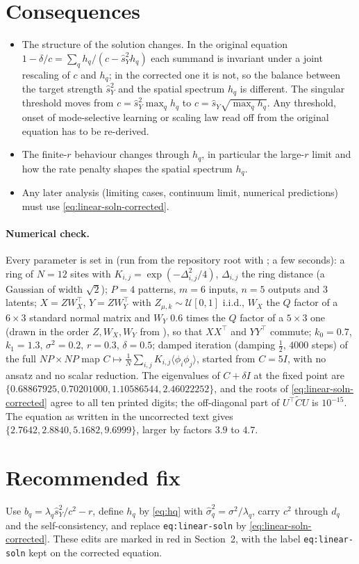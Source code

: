 \documentclass[11pt,a4paper]{article}
\begin{document}
\section{Consequences}
\begin{itemize}
  \item The structure of the solution changes. In the original equation $1-\delta/c = \sum_q h_q/(c-\hat s_Y^2h_q)$ each summand is invariant under a joint rescaling of $c$ and $h_q$; in the corrected one it is not, so the balance between the target strength $\hat s_Y^2$ and the spatial spectrum $h_q$ is different. The singular threshold moves from $c = \hat s_Y^2\max_q h_q$ to $c = \hat s_Y\sqrt{\max_q h_q}$. Any threshold, onset of mode-selective learning or scaling law read off from the original equation has to be re-derived.
  \item The finite-$r$ behaviour changes through $h_q$, in particular the large-$r$ limit and how the rate penalty shapes the spatial spectrum $h_q$.
  \item Any later analysis (limiting cases, continuum limit, numerical predictions) must use \eqref{eq:linear-soln-corrected}.
\end{itemize}

\paragraph{Numerical check.}
Every parameter is set in  (run from the repository root with ; a few seconds):
a ring of $N=12$ sites with $K_{i,j} = \exp(-\Delta_{i,j}^2/4)$, $\Delta_{i,j}$ the ring distance (a Gaussian of width $\sqrt2$);
$P=4$ patterns, $m=6$ inputs, $n=5$ outputs and $3$ latents;
$X = ZW_X^\top$, $Y = ZW_Y^\top$ with $Z_{\mu,k}\sim\mathcal U[0,1]$ i.i.d., $W_X$ the $Q$ factor of a $6\times3$ standard normal matrix and $W_Y$ $0.6$ times the $Q$ factor of a $5\times3$ one (drawn in the order $Z, W_X, W_Y$ from ), so that $XX^\top$ and $YY^\top$ commute;
$k_0 = 0.7$, $k_1 = 1.3$, $\sigma^2 = 0.2$, $r = 0.3$, $\delta = 0.5$;
damped iteration (damping $\tfrac12$, $4000$ steps) of the full $NP\times NP$ map $C \mapsto \frac1N\sum_{i,j}K_{i,j}\langle\phi_i\phi_j\rangle$, started from $C = 5I$, with no ansatz and no scalar reduction.
The eigenvalues of $C+\delta I$ at the fixed point are $\{0.68867925, 0.70201000, 1.10586544, 2.46022252\}$, and the roots of \eqref{eq:linear-soln-corrected} agree to all ten printed digits; the off-diagonal part of $U^\top\tilde C U$ is $10^{-15}$.
The equation as written in the uncorrected text gives $\{2.7642, 2.8840, 5.1682, 9.6999\}$, larger by factors $3.9$ to $4.7$.

\section{Recommended fix}
Use $b_q = \lambda_q\hat s_Y^2/c^2 - r$, define $h_q$ by \eqref{eq:hq} with $\hat\sigma_q^2 = \sigma^2/\lambda_q$, carry $c^2$ through $d_q$ and the self-consistency, and replace \texttt{eq:linear-soln} by \eqref{eq:linear-soln-corrected}. These edits are marked in red in Section~2, with the label \texttt{eq:linear-soln} kept on the corrected equation.
\end{document}
